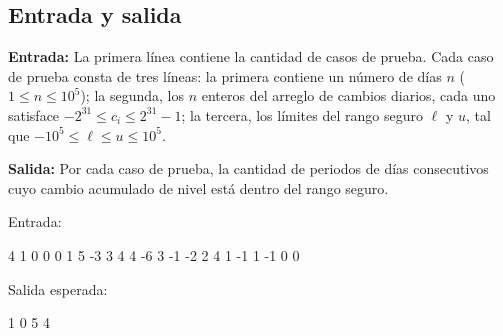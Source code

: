 \subsection{Entrada y salida}

\textbf{Entrada:} La primera línea contiene la cantidad de casos de prueba. Cada caso de prueba consta de tres líneas: la primera contiene un número de días $n$ ($1 \le n \le 10^5$); la segunda, los $n$ enteros del arreglo de cambios diarios, cada uno satisface $-2^{31} \le c_i \le 2^{31}-1$; la tercera, los límites del rango seguro $\ell$ y $u$, tal que $-10^5 \le \ell \le u \le 10^5$.

\textbf{Salida:} Por cada caso de prueba, la cantidad de periodos de días consecutivos cuyo cambio acumulado de nivel está dentro del rango seguro.

Entrada:
\begin{pseudocode}
4
1
0
0 0
1
5
-3 3
4
4 -6 3 -1
-2 2
4
1 -1 1 -1
0 0
\end{pseudocode}

Salida esperada:
\begin{pseudocode}
1
0
5
4
\end{pseudocode}
